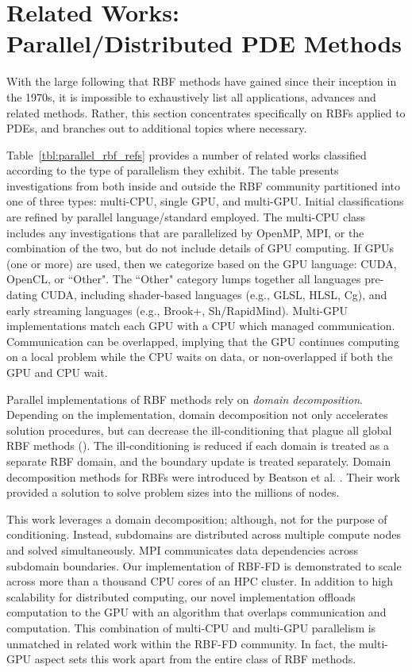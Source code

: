 \documentclass[11pt]{report}
\begin{document}
\section{Related Works: Parallel/Distributed PDE Methods} 

With the large following that RBF methods have gained since their inception in the 1970s, it is impossible to exhaustively list all 
applications, advances and related methods. Rather, this section concentrates specifically on RBFs applied to PDEs, and branches out to additional topics where necessary. %

Table~\ref{tbl:parallel_rbf_refs} provides a number of related works classified according to the type of parallelism they exhibit. The table presents investigations from both inside and outside the RBF community partitioned into one of three types: multi-CPU, single GPU, and multi-GPU. Initial classifications are refined by parallel language/standard employed. The multi-CPU class includes any investigations that are parallelized by OpenMP, MPI, or the combination of the two, but do not include details of GPU computing. If GPUs (one or more) are used, then we categorize based on the GPU language: CUDA, OpenCL, or ``Other". The ``Other" category lumps together all languages pre-dating CUDA, including shader-based languages (e.g., GLSL, HLSL, Cg), and early streaming languages (e.g., Brook+, Sh/RapidMind). Multi-GPU implementations match each GPU with a CPU which managed communication. Communication can be overlapped, implying that the GPU continues computing on a local problem while the CPU waits on data, or non-overlapped if both the GPU and CPU wait. 

Parallel implementations of RBF methods rely on \emph{domain decomposition}. Depending on the implementation, domain decomposition not only accelerates solution procedures, but can decrease the ill-conditioning that plague all global RBF methods (\cite{Divo2007}). The ill-conditioning is reduced if each domain is treated as a separate RBF domain, and the boundary update is treated separately. Domain decomposition methods for RBFs were introduced by Beatson et al. \cite{Beatson2000}. Their work provided a solution to solve problem sizes into the millions of nodes.

This work leverages a domain decomposition; although, not for the purpose of conditioning. Instead, subdomains are distributed across multiple compute nodes and solved simultaneously. MPI communicates data dependencies across subdomain boundaries. Our implementation of RBF-FD is demonstrated to scale across more than a thousand CPU cores of an HPC cluster. In addition to high scalability for distributed computing, our novel implementation offloads computation to the GPU with an algorithm that overlaps communication and computation. This combination of multi-CPU and multi-GPU parallelism is unmatched in related work within the RBF-FD community. In fact, the multi-GPU aspect sets this work apart from the entire class of RBF methods. 
\end{document}
